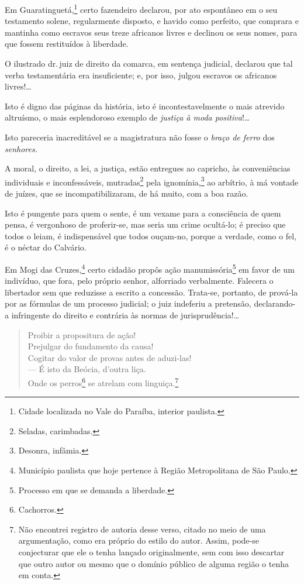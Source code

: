 Em Guaratinguetá,\footnote{Cidade localizada no Vale do Paraíba,
  interior paulista.} certo fazendeiro declarou, por ato espontâneo em
o seu testamento solene, regularmente disposto, e havido como perfeito,
que comprara e mantinha como escravos seus treze africanos livres e
declinou os seus nomes, para que fossem restituídos à liberdade.

O ilustrado dr.\,juiz de direito da comarca, em sentença judicial,
declarou que tal verba testamentária era insuficiente; e, por isso,
julgou escravos os africanos livres!\ldots{}

Isto é digno das páginas da história, isto é incontestavelmente o mais
atrevido altruísmo, o mais esplendoroso exemplo de \emph{justiça à moda
positiva}!\ldots{}

Isto pareceria inacreditável se a magistratura não fosse o \emph{braço
de ferro} dos \emph{senhores.}

A moral, o direito, a lei, a justiça, estão entregues ao capricho, às
conveniências individuais e inconfessáveis, mutradas\footnote{Seladas,
  carimbadas.} pela ignomínia,\footnote{Desonra, infâmia.} ao
arbítrio, à má vontade de juízes, que se incompatibilizaram, de há
muito, com a boa razão.

Isto é pungente para quem o sente, é um vexame para a consciência de
quem pensa, é vergonhoso de proferir-se, mas seria um crime ocultá-lo; é
preciso que todos o leiam, é indispensável que todos ouçam-no, porque a
verdade, como o fel, é o néctar do Calvário.

Em Mogi das Cruzes,\footnote{Município paulista que hoje pertence à
  Região Metropolitana de São Paulo.} certo cidadão propôs ação
manumissória\footnote{Processo em que se demanda a liberdade.} em
favor de um indivíduo, que fora, pelo próprio senhor, alforriado
verbalmente. Falecera o libertador sem que reduzisse a escrito a
concessão. Trata-se, portanto, de prová-la por as fórmulas de um
processo judicial; o juiz indeferiu a pretensão, declarando-a
infringente do direito e contrária às normas de jurisprudência!\ldots{}

\begin{verse}
Proibir a propositura de ação!\\
Prejulgar do fundamento da causa!\\
Cogitar do valor de provas antes de aduzi-las!\\
--- É isto da Beócia, d'outra liça.\\
Onde os perros\footnote{Cachorros.} se atrelam com linguiça.\footnote{
  Não encontrei registro de autoria desse verso, citado no meio de uma
  argumentação, como era próprio do estilo do autor. Assim, pode-se
  conjecturar que ele o tenha lançado originalmente, sem com isso
  descartar que outro autor ou mesmo que o domínio público de alguma
  região o tenha em conta.}
\end{verse}  

